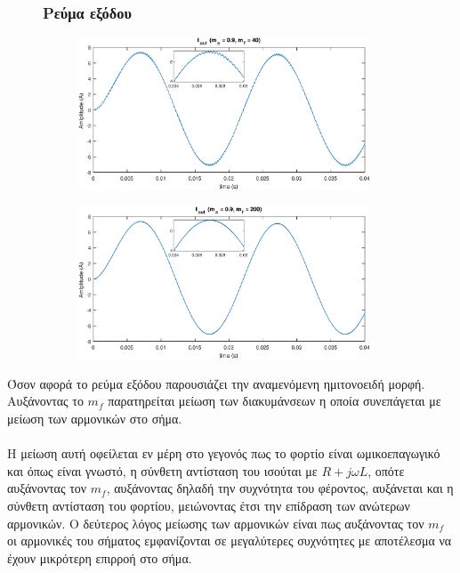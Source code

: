\begin{figure}[h!]
	\subsubsection*{Ρεύμα εξόδου}
	\begin{subfigure}{0.49\textwidth}
		\centering
		\includegraphics[width=0.95\textwidth]{Images/I_out_40}
	\end{subfigure}
	\begin{subfigure}{0.49\textwidth}
		\centering
		\includegraphics[width=0.95\textwidth]{Images/I_out_200}
	\end{subfigure}
\end{figure}
\clearpage
\noindent
Όσον αφορά το ρεύμα εξόδου παρουσιάζει την αναμενόμενη ημιτονοειδή μορφή. Αυξάνοντας το $m_f$ παρατηρείται μείωση των διακυμάνσεων η οποία συνεπάγεται με μείωση των αρμονικών στο σήμα.\\\\
Η μείωση αυτή οφείλεται εν μέρη στο γεγονός πως το φορτίο είναι ωμικοεπαγωγικό και όπως είναι γνωστό, η σύνθετη αντίσταση του ισούται με $R + j\omega L$, οπότε αυξάνοντας τον $m_f$, αυξάνοντας δηλαδή την συχνότητα του φέροντος, αυξάνεται και η σύνθετη αντίσταση του φορτίου, μειώνοντας  έτσι την επίδραση των ανώτερων αρμονικών. Ο δεύτερος λόγος μείωσης των αρμονικών είναι πως  αυξάνοντας τον $m_f$ οι αρμονικές του σήματος εμφανίζονται σε μεγαλύτερες συχνότητες με αποτέλεσμα να έχουν μικρότερη επιρροή στο σήμα.\\

